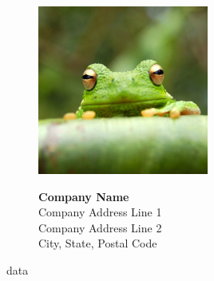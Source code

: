 \documentclass{article}
\begin{document}
\begin{figure}[t]
    \centering
    \begin{minipage}[t]{0.3\textwidth}
        \vspace{0pt} %
        \includegraphics[width=0.5\textwidth]{logo.jpg}
    \end{minipage}
    \hfill
    \begin{minipage}[t]{0.6\textwidth}
        \vspace{0pt} %
        \raggedleft
        {\LARGE\textbf{Company Name}} \\
        \raggedleft
        Company Address Line 1 \\
        Company Address Line 2 \\
        City, State, Postal Code
    \end{minipage}
\end{figure}


{{data}}

\end{document}
